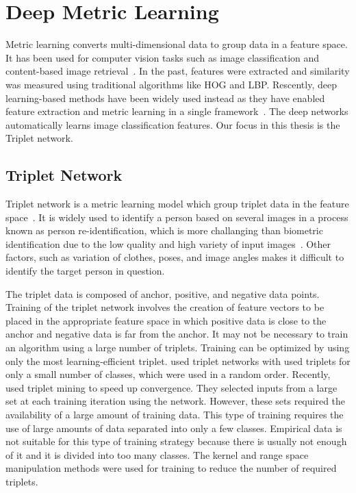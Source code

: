 \label{chp:Preliminary}
\section{Deep Metric Learning}
Metric learning converts multi-dimensional data to group data in a feature space.
It has been used for computer vision tasks such as image classification and content-based image retrieval~\cite{yang2006distance}. In the past, features were extracted and similarity was measured using traditional algorithms like HOG and LBP. Rescently, deep learning-based methods have been widely used instead as they have enabled feature extraction and metric learning in a single framework~\cite{yi2014deep}. The deep networks automatically learns image classification features.
Our focus in this thesis is the Triplet network.

\subsection{Triplet Network}
Triplet network is a metric learning model which group triplet data in the feature space~\cite{weinberger2006distance,yang2006distance}.
It is widely used to identify a person based on  several images in a process known as person re-identification, which is more challanging than biometric identification due to the low quality and high variety of input images~\cite{yi2014deep}. Other factors, such as variation of clothes, poses, and image angles makes it difficult to identify the target person in question.

The triplet data is composed of anchor, positive, and negative data points. Training of the triplet network involves the creation of feature vectors to be placed in the appropriate feature space in which positive data is close to the anchor and negative data is far from the anchor.
It may not be necessary to train an algorithm using a large number of triplets. Training can be optimized by using only the most learning-efficient triplet. \cite{cheng2016person,ding2015deep,wang2016joint} used triplet networks with used triplets for only a small number of classes, which were used in a random order.
Recently,~\cite{schroff2015facenet} used triplet mining to speed up convergence. They selected inputs from a large set at each training iteration using the network.
However, these sets required the availability of a large amount of training data. This type of training requires the use of large amounts of data separated into only a few classes. Empirical data is not suitable for this type of training strategy because there is usually not enough of it and it is divided into too many classes.
The kernel and range space manipulation methods were used for training to reduce the number of required triplets.

